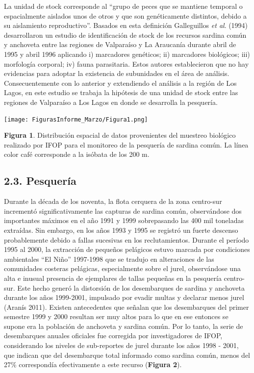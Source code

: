 \documentclass[
  spanish,
]{article}
\begin{document}
La unidad de stock corresponde al ``grupo de peces que se mantiene
temporal o espacialmente aislados unos de otros y que son genéticamente
distintos, debido a su aislamiento reproductivo''. Basados en esta
definición Galleguillos \emph{et al}. (1994) desarrollaron un estudio de
identificación de stock de los recursos sardina común y anchoveta entre
las regiones de Valparaíso y La Araucanía durante abril de 1995 y abril
1996 aplicando i) marcadores genéticos; ii) marcadores biológicos; iii)
morfología corporal; iv) fauna parasitaria. Estos autores establecieron
que no hay evidencias para adoptar la existencia de subunidades en el
área de análisis. Consecuentemente con lo anterior y extendiendo el
análisis a la región de Los Lagos, en este estudio se trabaja la
hipótesis de una unidad de stock entre las regiones de Valparaíso a Los
Lagos en donde se desarrolla la pesquería.

\begin{center}
\texttt{[image: FigurasInforme\_Marzo/Figura1.png]}
\end{center}

\small

\textbf{Figura 1}. Distribución espacial de datos provenientes del
muestreo biológico realizado por IFOP para el monitoreo de la pesquería
de sardina común. La línea color café corresponde a la isóbata de los
200 m. \vspace{0.5cm} \normalsize

\hypertarget{pesqueruxeda}{%
\subsection{2.3. Pesquería}\label{pesqueruxeda}}

Durante la década de los noventa, la flota cerquera de la zona
centro-sur incrementó significativamente las capturas de sardina común,
observándose dos importantes máximos en el año 1991 y 1999 sobrepasando
las 400 mil toneladas extraídas. Sin embargo, en los años 1993 y 1995 se
registró un fuerte descenso probablemente debido a fallas sucesivas en
los reclutamientos. Durante el período 1995 al 2000, la extracción de
pequeños pelágicos estuvo marcada por condiciones ambientales ``El
Niño'' 1997-1998 que se tradujo en alteraciones de las comunidades
costeras pelágicas, especialmente sobre el jurel, observándose una alta
e inusual presencia de ejemplares de tallas pequeñas en la pesquería
centro-sur. Este hecho generó la distorsión de los desembarques de
sardina y anchoveta durante los años 1999-2001, impulsado por evadir
multas y declarar menos jurel (Aranís 2011). Existen antecedentes que
señalan que los desembarques del primer semestre 1999 y 2000 resultan
ser muy altos para lo que en ese entonces se supone era la población de
anchoveta y sardina común. Por lo tanto, la serie de desembarques
anuales oficiales fue corregida por investigadores de IFOP, considerando
los niveles de sub-reportes de jurel durante los años 1998 - 2001, que
indican que del desembarque total informado como sardina común, menos
del 27\% correspondía efectivamente a este recurso (\textbf{Figura 2}).
\end{document}
